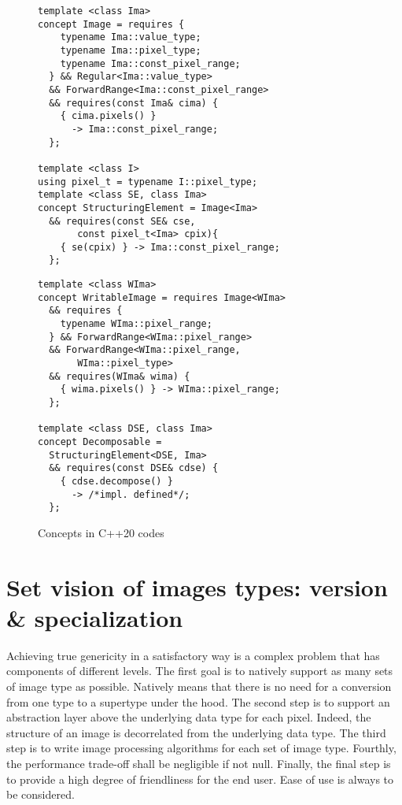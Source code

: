 \begin{figure}[htbp]

  \begin{minipage}[l]{0.48\linewidth}
    \begin{verbatim}
template <class Ima>
concept Image = requires {
    typename Ima::value_type;
    typename Ima::pixel_type;
    typename Ima::const_pixel_range;
  } && Regular<Ima::value_type>
  && ForwardRange<Ima::const_pixel_range>
  && requires(const Ima& cima) {
    { cima.pixels() }
      -> Ima::const_pixel_range;
  };

template <class I>
using pixel_t = typename I::pixel_type;
template <class SE, class Ima>
concept StructuringElement = Image<Ima>
  && requires(const SE& cse,
       const pixel_t<Ima> cpix){
    { se(cpix) } -> Ima::const_pixel_range;
  };
\end{verbatim}
  \end{minipage}
  \hfill
  \begin{minipage}[r]{0.48\linewidth}
    \begin{verbatim}
template <class WIma>
concept WritableImage = requires Image<WIma>
  && requires {
    typename WIma::pixel_range;
  } && ForwardRange<WIma::pixel_range>
  && ForwardRange<WIma::pixel_range,
       WIma::pixel_type>
  && requires(WIma& wima) {
    { wima.pixels() } -> WIma::pixel_range;
  };

template <class DSE, class Ima>
concept Decomposable =
  StructuringElement<DSE, Ima>
  && requires(const DSE& cdse) {
    { cdse.decompose() }
      -> /*impl. defined*/;
  };
\end{verbatim}
  \end{minipage}

  \caption{Concepts in C++20 codes}
  \label{concept.cpp20.code}
\end{figure}




\chapter{Set vision of images types: version \& specialization}

Achieving true genericity in a satisfactory way is a complex problem that has components of different levels. The first
goal is to natively support as many sets of image type as possible. Natively means that there is no need for a
conversion from one type to a supertype under the hood. The second step is to support an abstraction layer above the
underlying data type for each pixel. Indeed, the structure of an image is decorrelated from the underlying data type.
The third step is to write image processing algorithms for each set of image type. Fourthly, the performance trade-off
shall be negligible if not null. Finally, the final step is to provide a high degree of friendliness for the end user.
Ease of use is always to be considered.

